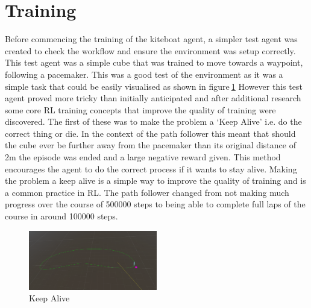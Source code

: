 \section{Training}\label{sec:training}
Before commencing the training of the kiteboat agent, a simpler test agent was created to check the workflow and ensure the environment was setup correctly. This test agent was a simple cube that was trained to move towards a waypoint, following a pacemaker. This was a good test of the environment as it was a simple task that could be easily visualised as shown in figure$~$\ref{pathFollower} However this test agent proved more tricky than initially anticipated and after additional research some core RL training concepts that improve the quality of training were discovered. The first of these was to make the problem a `Keep Alive' i.e. do the correct thing or die. In the context of the path follower this meant that should the cube ever be further away from the pacemaker than its original distance of 2m the episode was ended and a large negative reward given. This method encourages the agent to do the correct process if it wants to stay alive. Making the problem a keep alive is a simple way to improve the quality of training and is a common practice in RL. The path follower changed from not making much progress over the course of 500000 steps to being able to complete full laps of the course in around 100000 steps.

\begin{figure}[h]
    \centering
    \includegraphics[width=0.5\textwidth]{Images/practiceTraining.png}
    \caption{Keep Alive}\label{pathFollower}
\end{figure}

